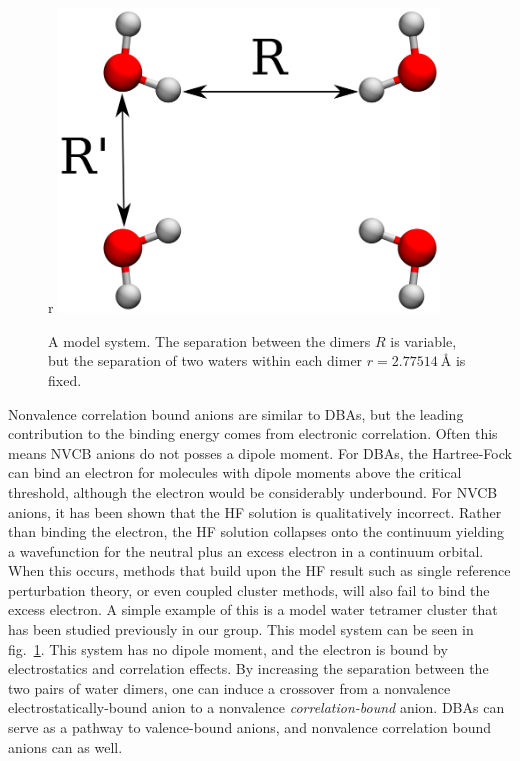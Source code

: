 \begin{figure}{r}
    \centering
	\includegraphics[width=0.9\textwidth,keepaspectratio]{Images/chapter1/h2o4_labeled.eps}
	\caption{A model  system. The separation between the dimers $R$ is variable, but the separation of two waters within each dimer $r=\SI{2.77514}{\angstrom}$ is fixed.}
	\label{fig:h2o4}
\end{figure}
Nonvalence correlation bound anions are similar to DBAs, but the leading contribution to the binding energy comes from electronic correlation.
Often this means NVCB anions do not posses a dipole moment.
For DBAs, the Hartree-Fock can bind an electron for molecules with dipole moments above the critical threshold, although the electron would be considerably underbound.
For NVCB anions, it has been shown that the HF solution is qualitatively incorrect.
Rather than binding the electron, the HF solution collapses onto the continuum yielding a wavefunction for the neutral plus an excess electron in a continuum orbital.
When this occurs, methods that build upon the HF result such as single reference perturbation theory, or even coupled cluster methods, will also fail to bind the excess electron.
A simple example of this is a model water tetramer cluster that has been studied previously in our group.\cite{Voora2017}
This model system can be seen in fig.~\ref{fig:h2o4}.
This system has no dipole moment, and the electron is bound by electrostatics and correlation effects.
By increasing the separation between the two pairs of water dimers, one can induce a crossover from a nonvalence electrostatically-bound anion to a nonvalence \textit{correlation-bound} anion.
DBAs can serve as a pathway to valence-bound anions\cite{Hendricks_JCP_1998,Compton_JCP_1996,Desfrancois_JCP_1996,Desfrancois_JPCA_1998}, and nonvalence correlation bound anions can as well. \cite{Voora20142}

